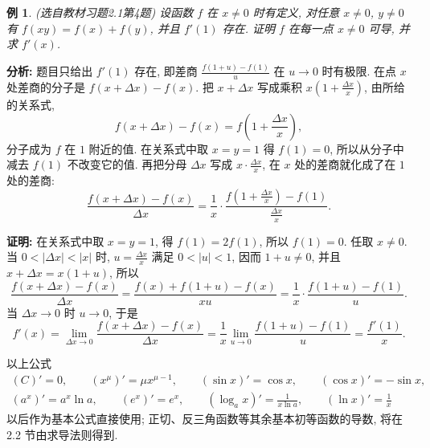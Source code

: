 \documentclass[UTF8,openany]{ctexbook}
\theoremstyle{chinesetextbook}
\newtheorem{example}{例}[section]
\newenvironment{cnproof}{\par\indent\textbf{证明:} \ignorespaces}{\par}
\begin{document}
\begin{example}\label{ex:c2-h1-4}
\textnormal{(选自教材习题2.1第4题)} 设函数 $f$ 在 $x\ne0$ 时有定义, 对任意 $x\ne0$, $y\ne0$ 有 $f(xy)=f(x)+f(y)$, 并且 $f'(1)$ 存在. 证明 $f$ 在每一点 $x\ne0$ 可导, 并求 $f'(x)$.
\end{example}
\par\indent\textbf{分析:} 题目只给出 $f'(1)$ 存在, 即差商 $\displaystyle\frac{f(1+u)-f(1)}u$ 在 $u\to0$ 时有极限. 在点 $x$ 处差商的分子是 $f(x+\Delta x)-f(x)$. 把 $x+\Delta x$ 写成乘积 $\displaystyle x\left(1+\frac{\Delta x}x\right)$, 由所给的关系式,
\[
f(x+\Delta x)-f(x)=f\left(1+\frac{\Delta x}x\right),
\]
分子成为 $f$ 在 $1$ 附近的值. 在关系式中取 $x=y=1$ 得 $f(1)=0$, 所以从分子中减去 $f(1)$ 不改变它的值. 再把分母 $\Delta x$ 写成 $\displaystyle x\cdot\frac{\Delta x}x$, 在 $x$ 处的差商就化成了在 $1$ 处的差商:
\[
\frac{f(x+\Delta x)-f(x)}{\Delta x}=\frac1x\cdot\frac{f\left(1+\frac{\Delta x}x\right)-f(1)}{\frac{\Delta x}x}.
\]
\begin{cnproof}
在关系式中取 $x=y=1$, 得 $f(1)=2f(1)$, 所以 $f(1)=0$. 任取 $x\ne0$. 当 $0<|\Delta x|<|x|$ 时, $\displaystyle u=\frac{\Delta x}x$ 满足 $0<|u|<1$, 因而 $1+u\ne0$, 并且 $x+\Delta x=x(1+u)$, 所以
\[
\frac{f(x+\Delta x)-f(x)}{\Delta x}=\frac{f(x)+f(1+u)-f(x)}{xu}=\frac1x\cdot\frac{f(1+u)-f(1)}u.
\]
当 $\Delta x\to0$ 时 $u\to0$, 于是
\[
f'(x)=\lim_{\Delta x\to0}\frac{f(x+\Delta x)-f(x)}{\Delta x}=\frac1x\lim_{u\to0}\frac{f(1+u)-f(1)}u=\frac{f'(1)}x.
\]
\end{cnproof}
以上公式
\[
\begin{gathered}
(C)'=0,\qquad(x^\mu)'=\mu x^{\mu-1},\qquad(\sin x)'=\cos x,\qquad(\cos x)'=-\sin x,\\
(a^x)'=a^x\ln a,\qquad(e^x)'=e^x,\qquad(\log_ax)'=\frac1{x\ln a},\qquad(\ln x)'=\frac1x
\end{gathered}
\]
以后作为基本公式直接使用; 正切、反三角函数等其余基本初等函数的导数, 将在 2.2 节由求导法则得到.
\end{document}
